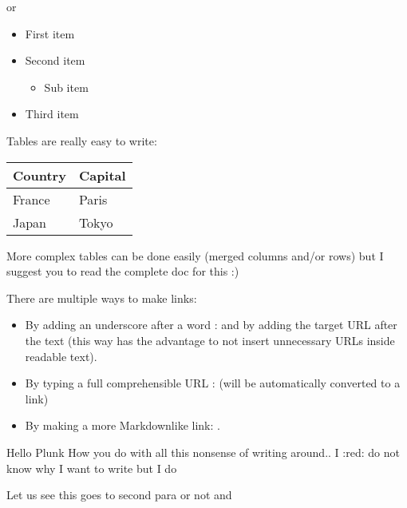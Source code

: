 \documentclass[letterpaper,10pt,english]{sphinxmanual}
\begin{document}
or
\begin{itemize}
\item {} 
First item

\item {} 
Second item
\begin{itemize}
\item {} 
Sub item

\end{itemize}

\item {} 
Third item

\end{itemize}

Tables are really easy to write:


\begin{savenotes}\sphinxattablestart
\centering
\begin{tabulary}{\linewidth}[t]{|T|T|}
\hline
\sphinxstyletheadfamily 
Country
&\sphinxstyletheadfamily 
Capital
\\
\hline
France
&
Paris
\\
\hline
Japan
&
Tokyo
\\
\hline
\end{tabulary}
\par
\sphinxattableend\end{savenotes}

More complex tables can be done easily (merged columns and/or rows) but I suggest you to read the complete doc for this :)

There are multiple ways to make links:
\begin{itemize}
\item {} 
By adding an underscore after a word :  and by adding the target URL after the text (this way has the advantage to not insert unnecessary URLs inside readable text).

\item {} 
By typing a full comprehensible URL :  (will be automatically converted to a link)

\item {} 
By making a more Markdown\sphinxhyphen{}like link:  .

\end{itemize}

\begin{DUlineblock}{0em}
\item[] Hello Plunk How you do with all this nonsense of writing around.. I :red: do not know why I want to write but I do
\item[] Let us see this goes to second para or not  and 
\end{DUlineblock}
\end{document}
